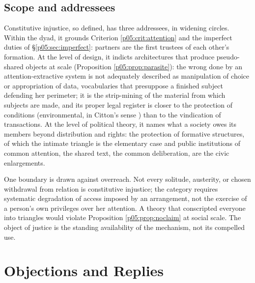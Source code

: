 \documentclass[11pt,a4paper]{article}
\theoremstyle{seriesthm}
\begin{document}
\subsection{Scope and addressees}
\label{p05:sec:scope}

Constitutive injustice, so defined, has three addressees, in widening circles. Within the dyad, it grounds Criterion \ref{p05:crit:attention} and the imperfect duties of §\ref{p05:sec:imperfect}: partners are the first trustees of each other's formation. At the level of design, it indicts architectures that produce pseudo-shared objects at scale (Proposition \ref{p05:prop:parasite}): the wrong done by an attention-extractive system is not adequately described as manipulation of choice or appropriation of data, vocabularies that presuppose a finished subject defending her perimeter; it is the strip-mining of the material from which subjects are made, and its proper legal register is closer to the protection of conditions (environmental, in Citton's sense \parencite{citton2017}) than to the vindication of transactions. At the level of political theory, it names what a society owes its members beyond distribution and rights: the protection of formative structures, of which the intimate triangle is the elementary case and public institutions of common attention, the shared text, the common deliberation, are the civic enlargements.

One boundary is drawn against overreach. Not every solitude, austerity, or chosen withdrawal from relation is constitutive injustice; the category requires systematic degradation of access imposed by an arrangement, not the exercise of a person's own privileges over her attention. A theory that conscripted everyone into triangles would violate Proposition \ref{p05:prop:noclaim} at social scale. The object of justice is the standing availability of the mechanism, not its compelled use.

\section{Objections and Replies}
\label{p05:sec:objections}
\end{document}
